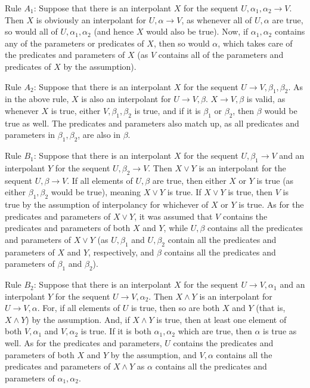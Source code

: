 \documentclass{article}
\theoremstyle{definition}
\begin{document}
Rule $A_1$: Suppose that there is an interpolant $X$ for the sequent $U,\alpha_1,\alpha_2\rightarrow V$. Then $X$ is obviously an interpolant for 
$U,\alpha\rightarrow V$, as whenever all of $U,\alpha$ are true, so would all of $U,\alpha_1,\alpha_2$ (and hence $X$ would also be true). Now, if 
$\alpha_1,\alpha_2$ contains any of the parameters or predicates of $X$, then so would $\alpha$, which takes care of the predicates and parameters of $X$ 
(as $V$ contains all of the parameters and predicates of $X$ by the assumption). 

Rule $A_2$: Suppose that there is an interpolant $X$ for the sequent $U\rightarrow V,\beta_1,\beta_2$. As in the above rule, $X$ is also an interpolant for 
$U\rightarrow V,\beta$. $X\rightarrow V,\beta$ is valid, as whenever $X$ is true, either $V,\beta_1,\beta_2$ is true, and if it is $\beta_1$ or 
$\beta_2$, then $\beta$ would be true as well. The predicates and parameters also match up, as all predicates and parameters in $\beta_1,\beta_2$, 
are also in $\beta$.

Rule $B_1$: Suppose that there is an interpolant $X$ for the sequent $U,\beta_1\rightarrow V$ and an interpolant $Y$ for the sequent
$U,\beta_2\rightarrow V$. Then $X\vee Y$ is an interpolant for the sequent $U,\beta\rightarrow V$. If all elements of 
$U,\beta$ are true, then either $X$ or $Y$ is true (as either $\beta_1,\beta_2$ would be true), 
meaning $X\vee Y$ is true. If $X\vee Y$ is true, then $V$ is true by the assumption of interpolancy 
for whichever of $X$ or $Y$ is true. As for the predicates and parameters of $X\vee Y$, it was assumed that $V$ contains the predicates and parameters of 
both $X$ and $Y$, while $U,\beta$ contains all the predicates and parameters of $X\vee Y$ (as $U,\beta_1$ and $U,\beta_2$ contain all the predicates and 
parameters of $X$ and $Y$, respectively, and $\beta$ contains all the predicates and parameters of $\beta_1$ and $\beta_2$).


Rule $B_2$: Suppose that there is an interpolant $X$ for the sequent $U\rightarrow V,\alpha_1$ and an interpolant $Y$ for the sequent 
$U\rightarrow V,\alpha_2$. Then $X\wedge Y$ is an interpolant for $U\rightarrow V,\alpha$. For, if all elements of $U$ is true, then so are both $X$ and $Y$ 
(that is, $X\wedge Y$) by the assumption. And, if $X\wedge Y$ is true, then at least one element of both $V,\alpha_1$ and $V,\alpha_2$ is true. 
If it is both $\alpha_1,\alpha_2$ which are true, then $\alpha$ is true as well. As for the predicates and parameters, $U$ contains the predicates and 
parameters of both $X$ and $Y$ by the assumption, and $V,\alpha$ contains all the predicates and parameters of $X\wedge Y$ as 
$\alpha$ contains all the predicates and parameters of $\alpha_1,\alpha_2$.
\end{document}
